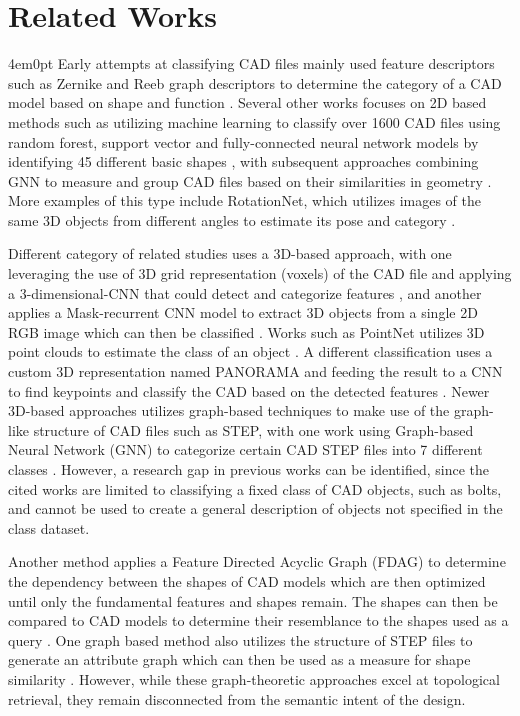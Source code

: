 \section{Related Works}
	\begin{indentedblock}{4em}{0pt}
		Early attempts at classifying CAD files mainly used feature descriptors such as Zernike and Reeb graph descriptors to determine the category of a CAD model based on shape and function \parencite{cad_ip}.  Several other works focuses on 2D based methods such as utilizing machine learning to classify over 1600 CAD files using random forest, support vector and fully-connected neural network models by identifying 45 different basic shapes \parencite{ml_machalica}, with subsequent approaches combining GNN to measure and group CAD files based on their similarities in geometry \parencite{cad_classification_roj}. More examples of this type include RotationNet, which utilizes images  of the same 3D objects from different angles to estimate its pose and category \parencite{rotationnet_kanezaki}. 
		
		
		Different category of related studies uses a 3D-based approach, with one leveraging the use of 3D grid representation (voxels) of the CAD file and applying a 3-dimensional-CNN that could detect and categorize features \parencite{voxnet_maturana}, and another applies a Mask-recurrent CNN model to extract 3D objects from a single 2D RGB image which can then be classified \parencite{can_mrcnn}. Works such as PointNet utilizes 3D point clouds to estimate the class of an object \parencite{pointnet_qi}. A different classification uses a custom 3D representation named PANORAMA and feeding the result to a CNN to find keypoints and classify the CAD based on the detected features \parencites{panorama_papadakis}{panorama_cnn_retrieval_sfikas}{panorama_cnn_ensemble_sfikas}. Newer 3D-based approaches utilizes graph-based techniques to make use of the graph-like structure of CAD files such as STEP, with one work using Graph-based Neural Network (GNN) to categorize certain CAD STEP files into 7 different classes \parencite{gnn_mandelli}. However, a research gap in previous works can be identified, since the cited works are limited to classifying a fixed class of CAD objects, such as bolts, and cannot be used to create a general description of objects not specified in the class dataset. 
		
		
		Another method applies a Feature Directed Acyclic Graph (FDAG) to determine the dependency between the shapes of CAD models which are then optimized until only the fundamental features and shapes remain. The shapes can then be compared to CAD models to determine their resemblance to the shapes used as a query \parencite{cnn_li}. One graph based method also utilizes the structure of STEP files to generate an attribute graph which can then be used as a measure for shape similarity \parencites{cad_el_mehalawi}{indexing_el_mehalawi}. However, while these graph-theoretic approaches excel at topological retrieval, they remain disconnected from the semantic intent of the design. 
		

\end{indentedblock}
